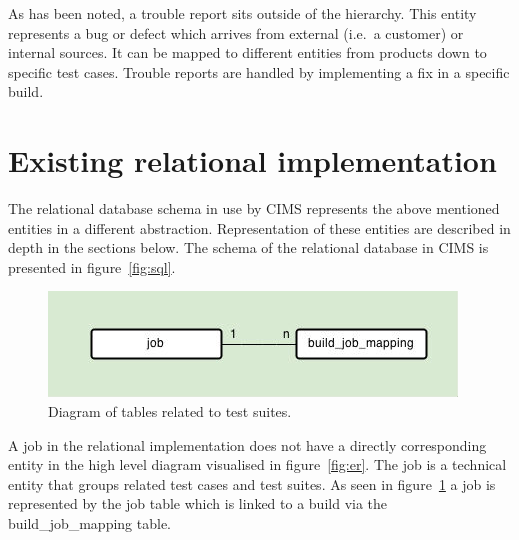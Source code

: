 As has been noted, a trouble report sits outside of the hierarchy. This entity represents a bug or defect which arrives from external (i.e.\ a customer) or internal sources. It can be mapped to different entities from products down to specific test cases. Trouble reports are handled by implementing a fix in a specific build.

\section{Existing relational implementation}
The relational database schema in use by CIMS represents the above mentioned entities in a different abstraction. Representation of these entities are described in depth in the sections below. 
The schema of the relational database in CIMS is presented in figure~\ref{fig:sql}.
\begin{figure}[h!]
\centering
\includegraphics[scale=0.5]{figure/job.jpg}
\caption{Diagram of tables related to test suites.}
\label{fig:job}
\end{figure}
A job in the relational implementation does not have a directly corresponding entity in the high level diagram visualised in figure~\ref{fig:er}. The job is a technical entity that groups related test cases and test suites. As seen in figure~\ref{fig:job} a job is represented by the job table which is linked to a build via the build\_job\_mapping table. 

